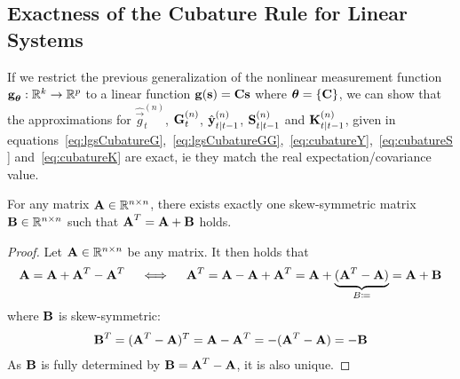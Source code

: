 	\subsection{Exactness of the Cubature Rule for Linear Systems}
		If we restrict the previous generalization of the nonlinear measurement function \( \boldsymbol{\mathrm{g}}_{\boldsymbol{\mathrm{\theta}}} : \mathbb{R}^k \to \mathbb{R}^p \) to a linear function \( \boldsymbol{\mathrm{g}}(\boldsymbol{\mathrm{s}}) = \boldsymbol{\mathrm{C}} \boldsymbol{\mathrm{s}} \) where \( \boldsymbol{\mathrm{\theta}} = \{ \boldsymbol{\mathrm{C}} \} \), we can show that the approximations for \( \hat{\vec{g}}_t^{(n)} \), \( \boldsymbol{\mathrm{G}}_t^{(n)} \), \( \hat{\boldsymbol{\mathrm{y}}}_{t \vert t - 1}^{(n)} \), \( \boldsymbol{\mathrm{S}}_{t \vert t - 1}^{(n)} \) and \( \boldsymbol{\mathrm{K}}_{t \vert t - 1}^{(n)} \), given in equations~\eqref{eq:lgsCubatureG},~\eqref{eq:lgsCubatureGG},~\eqref{eq:cubatureY},~\eqref{eq:cubatureS} and~\eqref{eq:cubatureK} are exact, \ac{ie} they match the real expectation/covariance value.

		\begin{lemma}
			For any matrix \( \boldsymbol{\mathrm{A}} \in \mathbb{R}^{n \times n} \), there exists exactly one skew-symmetric matrix \( \boldsymbol{\mathrm{B}} \in \mathbb{R}^{n \times n} \) such that \( \boldsymbol{\mathrm{A}}^T = \boldsymbol{\mathrm{A}} + \boldsymbol{\mathrm{B}} \) holds.
		\end{lemma}
		\begin{proof}
			Let \( \boldsymbol{\mathrm{A}} \in \mathbb{R}^{n \times n} \) be any matrix. It then holds that
			\begin{align*}
				\boldsymbol{\mathrm{A}} = \boldsymbol{\mathrm{A}} + \boldsymbol{\mathrm{A}}^T - \boldsymbol{\mathrm{A}}^T \quad\iff\quad \boldsymbol{\mathrm{A}}^T = \boldsymbol{\mathrm{A}} - \boldsymbol{\mathrm{A}} + \boldsymbol{\mathrm{A}}^T = \boldsymbol{\mathrm{A}} + \underbrace{(\boldsymbol{\mathrm{A}}^T - \boldsymbol{\mathrm{A}})}_{B \coloneqq} = \boldsymbol{\mathrm{A}} + \boldsymbol{\mathrm{B}}
			\end{align*}
			where \( \boldsymbol{\mathrm{B}} \) is skew-symmetric:
			\begin{align*}
				\boldsymbol{\mathrm{B}}^T = (\boldsymbol{\mathrm{A}}^T - \boldsymbol{\mathrm{A}})^T = \boldsymbol{\mathrm{A}} - \boldsymbol{\mathrm{A}}^T = -(\boldsymbol{\mathrm{A}}^T - \boldsymbol{\mathrm{A}}) = -\boldsymbol{\mathrm{B}}
			\end{align*}
			As \(\boldsymbol{\mathrm{B}}\) is fully determined by \( \boldsymbol{\mathrm{B}} = \boldsymbol{\mathrm{A}}^T - \boldsymbol{\mathrm{A}} \), it is also unique.
		\end{proof}

